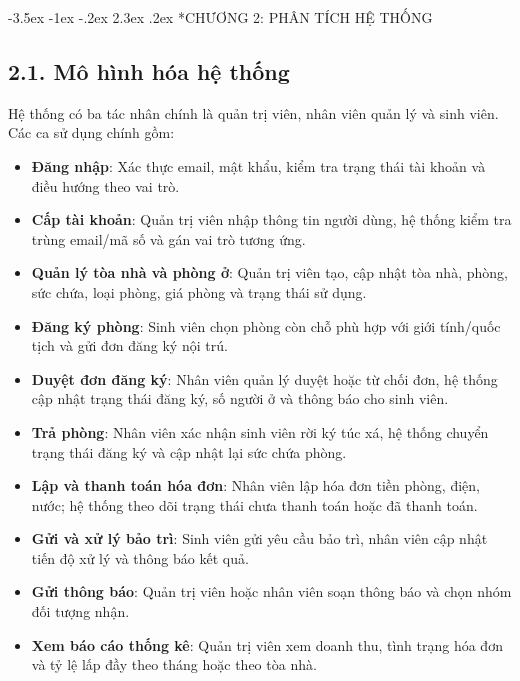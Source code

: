 \documentclass[13pt,a4paper]{extarticle}
\makeatletter
\renewcommand\section{\@startsection {section}{1}{\z@}%
	{-3.5ex \@plus -1ex \@minus -.2ex}%
	{2.3ex \@plus .2ex}%
	{\centering\normalfont\Large\bfseries}}
\makeatother
\begin{document}
	\section*{CHƯƠNG 2: PHÂN TÍCH HỆ THỐNG}
	
	\subsection*{2.1. Mô hình hóa hệ thống}
	Hệ thống có ba tác nhân chính là quản trị viên, nhân viên quản lý và sinh viên. Các ca sử dụng chính gồm:
	\begin{itemize}
		\item \textbf{Đăng nhập}: Xác thực email, mật khẩu, kiểm tra trạng thái tài khoản và điều hướng theo vai trò.
		\item \textbf{Cấp tài khoản}: Quản trị viên nhập thông tin người dùng, hệ thống kiểm tra trùng email/mã số và gán vai trò tương ứng.
		\item \textbf{Quản lý tòa nhà và phòng ở}: Quản trị viên tạo, cập nhật tòa nhà, phòng, sức chứa, loại phòng, giá phòng và trạng thái sử dụng.
		\item \textbf{Đăng ký phòng}: Sinh viên chọn phòng còn chỗ phù hợp với giới tính/quốc tịch và gửi đơn đăng ký nội trú.
		\item \textbf{Duyệt đơn đăng ký}: Nhân viên quản lý duyệt hoặc từ chối đơn, hệ thống cập nhật trạng thái đăng ký, số người ở và thông báo cho sinh viên.
		\item \textbf{Trả phòng}: Nhân viên xác nhận sinh viên rời ký túc xá, hệ thống chuyển trạng thái đăng ký và cập nhật lại sức chứa phòng.
		\item \textbf{Lập và thanh toán hóa đơn}: Nhân viên lập hóa đơn tiền phòng, điện, nước; hệ thống theo dõi trạng thái chưa thanh toán hoặc đã thanh toán.
		\item \textbf{Gửi và xử lý bảo trì}: Sinh viên gửi yêu cầu bảo trì, nhân viên cập nhật tiến độ xử lý và thông báo kết quả.
		\item \textbf{Gửi thông báo}: Quản trị viên hoặc nhân viên soạn thông báo và chọn nhóm đối tượng nhận.
		\item \textbf{Xem báo cáo thống kê}: Quản trị viên xem doanh thu, tình trạng hóa đơn và tỷ lệ lấp đầy theo tháng hoặc theo tòa nhà.
	\end{itemize}
	
\end{document}

